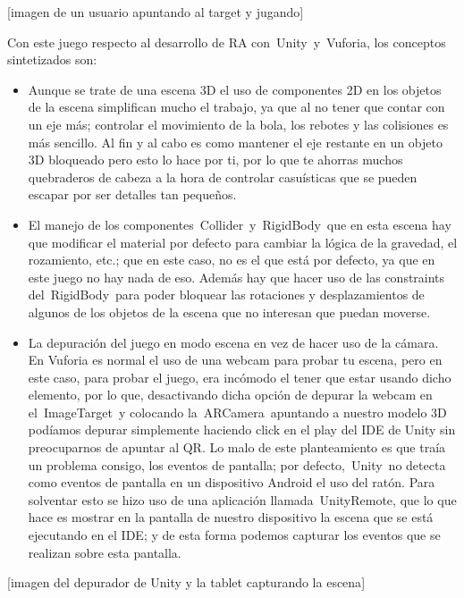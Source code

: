 \documentclass[]{article}
\begin{document}
{[}imagen de un usuario apuntando al target y jugando{]}

Con este juego respecto al desarrollo de RA con~Unity~y~Vuforia, los
conceptos sintetizados son:

\begin{itemize}
\itemsep1pt\parskip0pt
\item
  Aunque se trate de una escena 3D el uso de componentes 2D en los
  objetos de la escena simplifican mucho el trabajo, ya que al no tener
  que contar con un eje más; controlar el movimiento de la bola, los
  rebotes y las colisiones es más sencillo. Al fin y al cabo es como
  mantener el eje restante en un objeto 3D bloqueado pero esto lo hace
  por ti, por lo que te ahorras muchos quebraderos de cabeza a la hora
  de controlar casuísticas que se pueden escapar por ser detalles tan
  pequeños.
\item
  El manejo de los componentes~Collider~y~RigidBody~que en esta escena
  hay que modificar el material por defecto para cambiar la lógica de la
  gravedad, el rozamiento, etc.; que en este caso, no es el que está por
  defecto, ya que en este juego no hay nada de eso. Además hay que hacer
  uso de las constraints del~RigidBody~para poder bloquear las
  rotaciones y desplazamientos de algunos de los objetos de la escena
  que no interesan que puedan moverse.
\item
  La depuración del juego en modo escena en vez de hacer uso de la
  cámara. En Vuforia es normal el uso de una webcam para probar tu
  escena, pero en este caso, para probar el juego, era incómodo el tener
  que estar usando dicho elemento, por lo que, desactivando dicha opción
  de depurar la webcam en el~ImageTarget~y colocando
  la~ARCamera~apuntando a nuestro modelo 3D podíamos depurar simplemente
  haciendo click en el play del IDE de Unity sin preocuparnos de apuntar
  al QR. Lo malo de este planteamiento es que traía un problema consigo,
  los eventos de pantalla; por defecto,~Unity~no detecta como eventos de
  pantalla en un dispositivo Android el uso del ratón. Para solventar
  esto se hizo uso de una aplicación llamada~UnityRemote, que lo que
  hace es mostrar en la pantalla de nuestro dispositivo la escena que se
  está ejecutando en el IDE; y de esta forma podemos capturar los
  eventos que se realizan sobre esta pantalla.
\end{itemize}

{[}imagen del depurador de Unity y la tablet capturando la escena{]}
\end{document}
